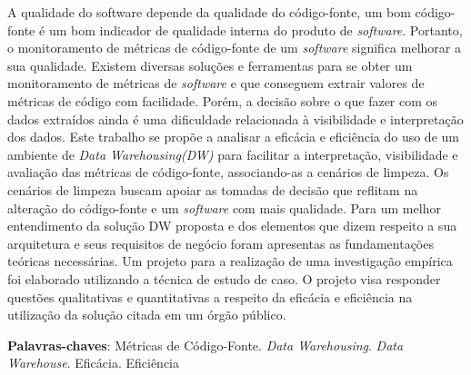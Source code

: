 \begin{resumo}




A qualidade do software depende da qualidade do código-fonte, um bom código-fonte é um bom indicador de
qualidade interna do produto de \textit{software}. Portanto, o monitoramento de métricas de código-fonte de um \textit{software} significa melhorar a sua qualidade. Existem diversas soluções e ferramentas para se obter um monitoramento de métricas de \textit{software} e que conseguem extrair valores de métricas de código com facilidade. Porém, a decisão sobre o que fazer com os dados extraídos ainda é uma
dificuldade relacionada à visibilidade e interpretação dos dados. Este trabalho se propõe a analisar a
eficácia e eficiência do uso de um ambiente de \textit{Data Warehousing(DW)} para facilitar a interpretação, visibilidade e avaliação das métricas de código-fonte, associando-as a cenários de limpeza. Os cenários de limpeza buscam apoiar as tomadas de decisão que reflitam na alteração do código-fonte e um \textit{software} com mais qualidade. Para um melhor entendimento da solução DW proposta e dos elementos que dizem respeito a sua arquitetura e seus requisitos de negócio foram apresentas as fundamentações teóricas necessárias. Um projeto para a realização de uma investigação empírica foi elaborado utilizando a técnica de estudo de caso. O projeto visa responder questões qualitativas e quantitativas a respeito da eficácia e eficiência na utilização da solução citada em um órgão público.
 
 

 \vspace{\onelineskip}
    
 \noindent
 \textbf{Palavras-chaves}: Métricas de Código-Fonte. \textit{Data Warehousing}. \textit{Data Warehouse}. Eficácia. Eficiência
\end{resumo}
